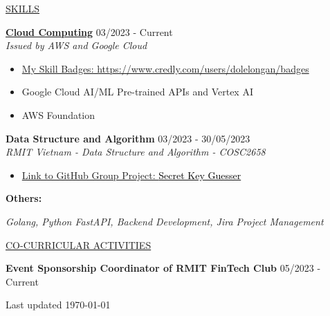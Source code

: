 \documentclass[11pt]{article}
\newcommand{\betteruline}[1]{
    \uline{#1}
}
\newcommand{\sectiontitle}[1]{
    \begingroup
        \titlebold
        \betteruline{\Large\uppercase{#1}  }
        \vspace{1.7mm}
    \endgroup
}
\newcommand{\sectioncontent}[1]{
    \begingroup
        \begin{FlushLeft}
        \vspace{-3mm}
        \sffamily\small#1
        \end{FlushLeft}
    \endgroup
    \vspace{2mm}
}
\newcommand{\project}[2]{
    \begingroup
        \textbf{\small#1}
        \hfill\color{black!70}\small{#2}
    \endgroup
}
\newcommand{\spacevv}{
    \vspace{2mm}
}
\begin{document}
\begin{paracol}{2}
    \sectiontitle{Skills}
    \sectioncontent{
    \vspace{1mm}
        \project{\href{https://www.credly.com/users/dolelongan/badgesl}{Cloud Computing}}{03/2023 - Current} \\
    \vspace{1mm}
        \textcolor{black!70}{\textit{Issued by AWS and Google Cloud}}
        \vspace{1mm}
        \begin{itemize}
            \item 
            \href{https://www.credly.com/users/dolelongan/badges}{My Skill Badges: https://www.credly.com/users/dolelongan/badges}
            \vspace{1mm}
            \item Google Cloud AI/ML Pre-trained APIs and Vertex AI
            \vspace{1mm}
            \item AWS Foundation
            \vspace{1mm}
        \end{itemize}
        \spacevv

       \project{Data Structure and Algorithm}{03/2023 - 30/05/2023} \\
    \vspace{1mm}
        \textcolor{black!70}{\textit{RMIT Vietnam - Data Structure and Algorithm - COSC2658}}
        \vspace{1mm}
        \begin{itemize}
            \item 
            \href{https://github.com/miketvo/rmit2023a-cosc2658-group-project}
            {Link to GitHub Group Project:  \textcolor{black}{Secret Key Guesser}}
            \vspace{1mm}
        \end{itemize}
        \spacevv

        \project{Others:}{}
    \vspace{1mm}
        {\textit{Golang, Python FastAPI, Backend Development, Jira Project Management}}
        \spacevv
        
    }

    \sectiontitle{CO-CURRICULAR ACTIVITIES}
    \sectioncontent{
    \vspace{1mm}

        \project{Event Sponsorship Coordinator of RMIT FinTech Club}{05/2023 - Current} \\
            \vspace{1mm} 
          \spacevv
    
    }

    \normaltext \hfill \tiny Last updated \today

    \end{paracol}
\end{document}
